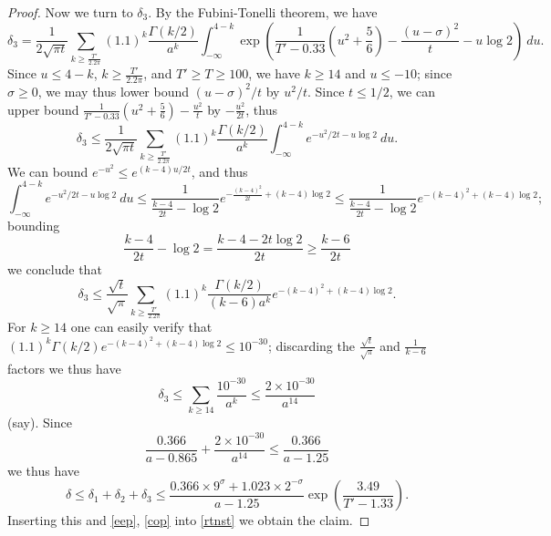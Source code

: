 \begin{proof}
Now we turn to $\delta_3$. By the Fubini-Tonelli theorem, we have
$$ \delta_3 = \frac{1}{2 \sqrt{\pi t}} \sum_{k \geq \frac{T'}{2.2 \pi}} (1.1)^{k} \frac{\Gamma(k/2)}{a^k} \int_{-\infty}^{4-k} \exp( \frac{1}{T'-0.33} (u^2 + \frac{5}{6}) - \frac{(u-\sigma)^2}{t} - u \log 2)\ du.$$
Since $u \leq 4-k$, $k \geq \frac{T'}{2.2\pi}$, and $T' \geq T \geq 100$, we have $k \geq 14$ and $u \leq -10$; since $\sigma \geq 0$, we may thus lower bound $(u-\sigma)^2/t$ by $u^2/t$.  Since $t \leq 1/2$, we can upper bound $\frac{1}{T'-0.33} (u^2 + \frac{5}{6}) - \frac{u^2}{t}$ by $-\frac{u^2}{2t}$, thus
$$ \delta_3 \leq \frac{1}{2 \sqrt{\pi t}} \sum_{k \geq \frac{T'}{2.2 \pi}} (1.1)^{k} \frac{\Gamma(k/2)}{a^k} \int_{-\infty}^{4-k} e^{-u^2/2t - u \log 2}\ du.$$
We can bound $e^{-u^2} \leq e^{(k-4)u/2t}$, and thus
$$ \int_{-\infty}^{4-k} e^{-u^2/2t - u \log 2}\ du \leq \frac{1}{\frac{k-4}{2t} - \log 2} e^{-\frac{(k-4)^2}{2t} + (k-4) \log 2} \leq \frac{1}{\frac{k-4}{2t} - \log 2} e^{-(k-4)^2 + (k-4) \log 2};$$
bounding
$$ \frac{k-4}{2t} - \log 2 = \frac{k-4-2t \log 2}{2t} \geq \frac{k-6}{2t}$$
we conclude that
$$ \delta_3 \leq \frac{\sqrt{t}}{\sqrt{\pi}} \sum_{k \geq \frac{T'}{2.2 \pi}} (1.1)^{k} \frac{\Gamma(k/2)}{(k-6) a^k} e^{-(k-4)^2 + (k-4) \log 2}.$$
For $k \geq 14$ one can easily verify that $(1.1)^{k} \Gamma(k/2) e^{-(k-4)^2 + (k-4) \log 2} \leq 10^{-30}$; discarding the $\frac{\sqrt{t}}{\sqrt{\pi}}$ and $\frac{1}{k-6}$ factors we thus have
$$ \delta_3 \leq \sum_{k \geq 14} \frac{10^{-30}}{a^k} \leq \frac{2 \times 10^{-30}}{a^{14}}$$
(say).   Since
$$ \frac{0.366}{a-0.865} + \frac{2 \times 10^{-30}}{a^{14}} \leq \frac{0.366}{a-1.25}$$
we thus have
$$ \delta \leq \delta_1+\delta_2+\delta_3 \leq \frac{0.366 \times 9^\sigma + 1.023 \times 2^{-\sigma}}{a-1.25} \exp( \frac{3.49}{T'-1.33} ).$$
Inserting this and \eqref{eep}, \eqref{cop} into \eqref{rtnst} we obtain the claim.
\end{proof}

